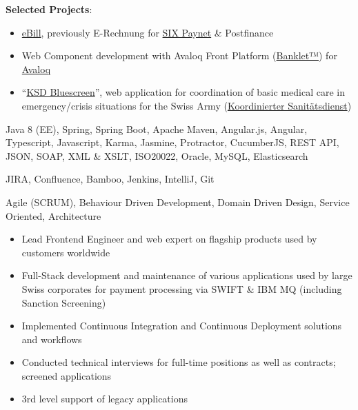 \smallskip
\textbf{Selected Projects}:
\smallskip
\begin{itemize}
	\item \href{https://www.ebill.ch/}{eBill}, previously E-Rechnung for \href{https://www.six-group.com/en/site/banking-services/paynet.html}{SIX Paynet} \& Postfinance
	\item Web Component development with Avaloq Front Platform (\href{https://developer.avaloq.com/web/developer-portal/learn}{Banklet™}) for \href{https://www.avaloq.com/en/}{Avaloq}
	\item \enquote{\href{https://blog.alertswiss.ch/de/rubriken/bevoelkerungsschutz/koordinierter-sanitaetsdienst-ksd-neues-management-tool-blue-screen-switzerland/}{KSD Bluescreen}}, web application for coordination of basic medical care in emergency/crisis situations for the Swiss Army (\href{https://www.vtg.admin.ch/de/organisation/astab/san/ksd.html}{Koordinierter Sanitätsdienst})
\end{itemize}

\medskip
\begin{description}
	\ifincludestech
	\item [Technologies] Java 8 (EE), Spring, Spring Boot, Apache Maven, Angular.js, Angular, Typescript, Javascript, Karma, Jasmine, Protractor, CucumberJS, REST API, JSON, SOAP, XML \& XSLT, ISO20022, Oracle, MySQL, Elasticsearch
	\fi
	\ifincludestools
	\item [Tools] JIRA, Confluence, Bamboo, Jenkins, IntelliJ, Git
	\fi
	\ifincludesmethods
	\item [Methodologies] Agile (SCRUM), Behaviour Driven Development, Domain Driven Design, Service Oriented, Architecture
	\fi
\end{description}

\divider


\medskip
\begin{itemize}
	\item Lead Frontend Engineer and web expert on flagship products used by customers worldwide
	\item Full-Stack development and maintenance of various applications used by large Swiss corporates for payment processing via SWIFT \& IBM MQ (including Sanction Screening)
	\item Implemented Continuous Integration and Continuous Deployment solutions and workflows 
	\item Conducted technical interviews for full-time positions as well as contracts; screened applications
	\item 3rd level support of legacy applications
\end{itemize}

